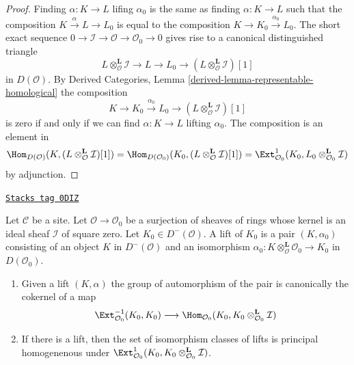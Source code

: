 \begin{proof}
Finding $\alpha : K \to L$ lifing $\alpha_0$ is the same as finding
$\alpha : K \to L$ such that the composition $K \xrightarrow{\alpha} L \to L_0$
is equal to the composition $K \to K_0 \xrightarrow{\alpha_0} L_0$.
The short exact sequence
$0 \to \mathcal{I} \to \mathcal{O} \to \mathcal{O}_0 \to 0$
gives rise to a canonical distinguished triangle
$$
L \otimes_\mathcal{O}^\mathbf{L} \mathcal{I} \to
L \to
L_0 \to
(L \otimes_\mathcal{O}^\mathbf{L} \mathcal{I})[1]
$$
in $D(\mathcal{O})$.
By Derived Categories, Lemma \ref{derived-lemma-representable-homological}
the composition
$$
K \to K_0 \xrightarrow{\alpha_0} L_0 \to
(L \otimes_\mathcal{O}^\mathbf{L} \mathcal{I})[1]
$$
is zero if and only if we can find $\alpha : K \to L$
lifting $\alpha_0$. The composition is an element in
$$
\Hom_{D(\mathcal{O})}(K, (L \otimes_\mathcal{O}^\mathbf{L} \mathcal{I})[1]) =
\Hom_{D(\mathcal{O}_0)}(K_0,
(L \otimes_\mathcal{O}^\mathbf{L} \mathcal{I})[1]) =
\Ext^1_{\mathcal{O}_0}(K_0,
L_0 \otimes_{\mathcal{O}_0}^\mathbf{L} \mathcal{I})
$$
by adjunction.
\end{proof}

\begin{lemma}
\label{defos-lemma-first-order-defos-complex}
\href{https://stacks.math.columbia.edu/tag/0DIZ}{\texttt{Stacks tag 0DIZ}}

Let $\mathcal{C}$ be a site. Let $\mathcal{O} \to \mathcal{O}_0$
be a surjection of sheaves of rings whose kernel is an ideal sheaf
$\mathcal{I}$ of square zero. Let $K_0 \in D^-(\mathcal{O})$.
A lift of $K_0$ is a pair $(K, \alpha_0)$ consisting of an object
$K$ in $D^-(\mathcal{O})$ and an isomorphism
$\alpha_0 : K \otimes_\mathcal{O}^\mathbf{L} \mathcal{O}_0 \to K_0$
in $D(\mathcal{O}_0)$.
\begin{enumerate}
\item Given a lift $(K, \alpha)$ the group of automorphism of the pair
is canonically the cokernel of a map
$$
\Ext^{-1}_{\mathcal{O}_0}(K_0, K_0)
\longrightarrow
\Hom_{\mathcal{O}_0}(K_0, K_0 \otimes_{\mathcal{O}_0}^\mathbf{L} \mathcal{I})
$$
\item If there is a lift, then the set of isomorphism classes of lifts
is principal homogenenous under
$\Ext^1_{\mathcal{O}_0}(K_0,
K_0 \otimes_{\mathcal{O}_0}^\mathbf{L} \mathcal{I})$.
\end{enumerate}
\end{lemma}

